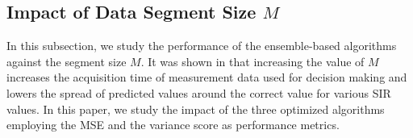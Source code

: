 

\subsection{Impact of Data Segment Size $M$}
In this subsection, we study the performance of the ensemble-based algorithms against the segment size $M$. It was shown in \cite{Candell_ISIT_2019} that increasing the value of $M$ increases the acquisition time of measurement data used for decision making and lowers the spread of predicted values around the correct value for various SIR values. In this paper, we study the impact of the three optimized algorithms employing the MSE and the variance score as performance metrics.

